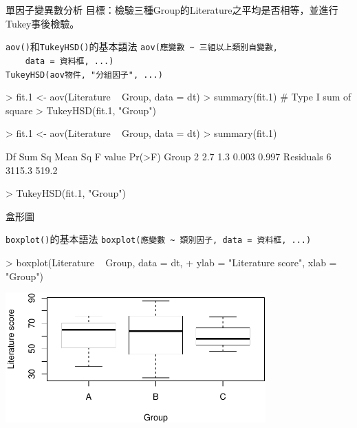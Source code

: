 \documentclass[14pt, aspectratio=43]{beamer}
\begin{document}
\begin{frame}{單因子變異數分析}
目標：檢驗三種Group的Literature之平均是否相等，並進行Tukey事後檢驗。

\begin{block}{\texttt{aov()}和\texttt{TukeyHSD()}的基本語法}
\verb+aov(應變數 ~ 三組以上類別自變數, +\\
\verb+    data = 資料框, ...)+\\
\verb+TukeyHSD(aov物件, "分組因子", ...)+
\end{block}
\begin{RC}
> fit.1 <- aov(Literature ~ Group, data = dt)
> summary(fit.1) # Type I sum of square
> TukeyHSD(fit.1, "Group")
\end{RC}


\framebreak

\begin{RC}
> fit.1 <- aov(Literature ~ Group, data = dt)
> summary(fit.1)
\end{RC}
\begin{R}
            Df Sum Sq Mean Sq F value Pr(>F)
Group        2    2.7     1.3   0.003  0.997
Residuals    6 3115.3   519.2               
\end{R}
\begin{RC}
> TukeyHSD(fit.1, "Group")
\end{RC}
\end{frame}

\begin{frame}[fragile]{盒形圖}

\begin{block}{\texttt{boxplot()}的基本語法}
\verb+boxplot(應變數 ~ 類別因子, data = 資料框, ...)+
\end{block}

\begin{RC}
> boxplot(Literature ~ Group, data = dt, 
+         ylab = "Literature score", xlab = "Group")
\end{RC}

\begin{center}
\includegraphics[width=0.75\textwidth]{Rplot-three-group.pdf}
\end{center}
\end{frame}
\end{document}
